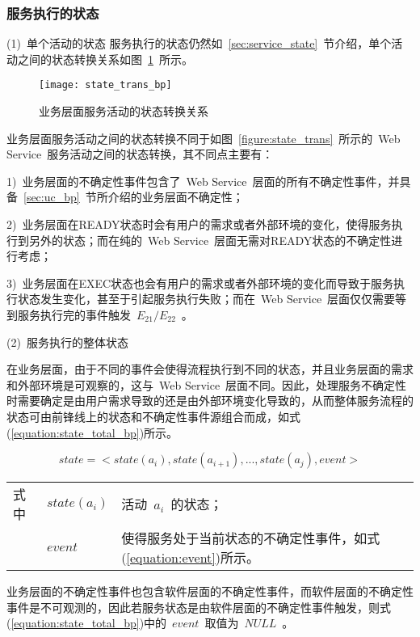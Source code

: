 \subsubsection{服务执行的状态}

(1)~单个活动的状态
服务执行的状态仍然如~\ref{sec:service_state}~节介绍，单个活动之间的状态转换关系如图~\ref{figure:state_trans_pb}~所示。

\begin{figure}[htbp]
    \centering
    \texttt{[image: state\_trans\_bp]}
    \caption{业务层面服务活动的状态转换关系}\label{figure:state_trans_pb}
    \vspace{-1em}
\end{figure}

业务层面服务活动之间的状态转换不同于如图~\ref{figure:state_trans}~所示的~Web Service~服务活动之间的状态转换，其不同点主要有：

1)~业务层面的不确定性事件包含了~Web Service~层面的所有不确定性事件，并具备~\ref{sec:uc_bp}~节所介绍的业务层面不确定性；

2)~业务层面在READY状态时会有用户的需求或者外部环境的变化，使得服务执行到另外的状态；而在纯的~Web Service~层面无需对READY状态的不确定性进行考虑；

3)~业务层面在EXEC状态也会有用户的需求或者外部环境的变化而导致于服务执行状态发生变化，甚至于引起服务执行失败；而在~Web Service~层面仅仅需要等到服务执行完的事件触发~$E_{21}/E_{22}$~。

(2)~服务执行的整体状态

在业务层面，由于不同的事件会使得流程执行到不同的状态，并且业务层面的需求和外部环境是可观察的，这与~Web Service~层面不同。因此，处理服务不确定性时需要确定是由用户需求导致的还是由外部环境变化导致的，从而整体服务流程的状态可由前锋线上的状态和不确定性事件源组合而成，如式(\ref{equation:state_total_bp})所示。

\begin{equation}\label{equation:state_total_bp}
state = < state(a_i),state(a_{i+1}),..., state(a_j), event >
\end{equation}
\begin{tabularx}{\textwidth}{@{}l@{\quad}l@{\pozhehao }X@{}}
    式中
    & $state(a_i)$ & 活动~$a_i$~的状态；\\
    & $event$ & 使得服务处于当前状态的不确定性事件，如式(\ref{equation:event})所示。
\end{tabularx}\vspace{\wordsep}

业务层面的不确定性事件也包含软件层面的不确定性事件，而软件层面的不确定性事件是不可观测的，因此若服务状态是由软件层面的不确定性事件触发，则式(\ref{equation:state_total_bp})中的~$event$~取值为~$NULL$~。


